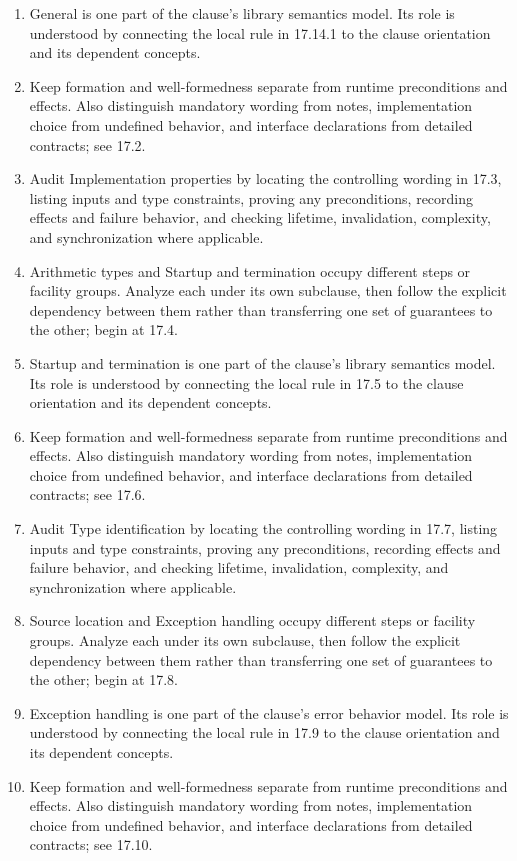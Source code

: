 \documentclass[11pt,letterpaper]{article}
\begin{document}
\begin{enumerate}
\item General is one part of the clause's library semantics model. Its role is understood by connecting the local rule in 17.14.1 to the clause orientation and its dependent concepts.
\item Keep formation and well-formedness separate from runtime preconditions and effects. Also distinguish mandatory wording from notes, implementation choice from undefined behavior, and interface declarations from detailed contracts; see 17.2.
\item Audit Implementation properties by locating the controlling wording in 17.3, listing inputs and type constraints, proving any preconditions, recording effects and failure behavior, and checking lifetime, invalidation, complexity, and synchronization where applicable.
\item Arithmetic types and Startup and termination occupy different steps or facility groups. Analyze each under its own subclause, then follow the explicit dependency between them rather than transferring one set of guarantees to the other; begin at 17.4.
\item Startup and termination is one part of the clause's library semantics model. Its role is understood by connecting the local rule in 17.5 to the clause orientation and its dependent concepts.
\item Keep formation and well-formedness separate from runtime preconditions and effects. Also distinguish mandatory wording from notes, implementation choice from undefined behavior, and interface declarations from detailed contracts; see 17.6.
\item Audit Type identification by locating the controlling wording in 17.7, listing inputs and type constraints, proving any preconditions, recording effects and failure behavior, and checking lifetime, invalidation, complexity, and synchronization where applicable.
\item Source location and Exception handling occupy different steps or facility groups. Analyze each under its own subclause, then follow the explicit dependency between them rather than transferring one set of guarantees to the other; begin at 17.8.
\item Exception handling is one part of the clause's error behavior model. Its role is understood by connecting the local rule in 17.9 to the clause orientation and its dependent concepts.
\item Keep formation and well-formedness separate from runtime preconditions and effects. Also distinguish mandatory wording from notes, implementation choice from undefined behavior, and interface declarations from detailed contracts; see 17.10.

\end{enumerate}
\end{document}
